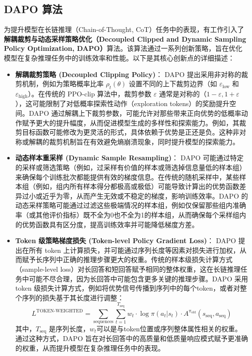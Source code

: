 \documentclass{article}
\begin{document}
\subsection{DAPO 算法}
为提升模型在长链推理（Chain-of-Thought, CoT）任务中的表现，有工作引入了\textbf{解耦裁剪与动态采样策略优化（Decoupled Clipped and Dynamic Sampling Policy Optimization, DAPO）}算法\cite{yu2025dapo}。该算法通过一系列创新策略，旨在优化模型在复杂推理任务中的训练效率和性能。以下是其核心创新点的详细描述：

\begin{itemize}
    \item \textbf{解耦裁剪策略 (Decoupled Clipping Policy)}：
    DAPO 提出采用非对称的裁剪机制，例如为策略概率比率 $\rho_t(\theta)$ 设置不同的上下裁剪边界（如 $\varepsilon_{\text{low}}$ 和 $\varepsilon_{\text{high}}$）。在传统的 PPO-clip 算法中，裁剪参数 $\varepsilon$ 通常是对称的（$1-\varepsilon, 1+\varepsilon$），这可能限制了对低概率探索性动作（exploration tokens）的奖励提升空间。DAPO 通过解耦上下裁剪参数，可能允许对那些带来正向优势的低概率动作赋予更大的提升幅度，从而促进模型生成的多样性和探索能力。例如，其裁剪目标函数可能修改为更灵活的形式，具体依赖于优势是正还是负。这种非对称或解耦的裁剪机制旨在有效避免熵崩溃现象，同时提升模型的探索能力。

    \item \textbf{动态样本重采样 (Dynamic Sample Resampling)}：
    DAPO 可能通过特定的采样或筛选策略（例如，过采样有价值的样本或筛选掉信息量低的样本组）来确保每个训练批次都能提供有效的梯度信息。在传统的随机采样中，某些样本组（例如，组内所有样本得分都极高或极低）可能导致计算出的优势函数差异过小或近乎为零，从而产生无效或不稳定的梯度，影响训练效率。DAPO 的动态采样策略可能通过过滤这些极端情况的样本组，例如仅保留那些组内准确率（或其他评价指标）既不全为0也不全为1的样本组，从而确保每个采样组内的优势函数具有区分度，提高训练效率并可能降低梯度方差。

    \item \textbf{Token 级策略梯度损失 (Token-level Policy Gradient Loss)}：
    DAPO 提出在所有 token 上计算损失，并可能通过序列长度等因素对损失进行加权，从而赋予长序列中正确的推理步骤更大的权重。传统的样本级损失计算方式（sample-level loss）对长回答和短回答赋予相同的整体权重，这在长链推理任务中可能不尽合理，因为长回答中可能包含更多关键的推理步骤。DAPO 采用 token 级损失计算方式，例如将优势信号传播到序列中的每个token，或者对整个序列的损失基于其长度进行调整：
    \[
    L^{\text{TOKEN-WEIGHTED}} = \sum_{\text{sequences}} \sum_{t=1}^{T_{\text{seq}}} w_t \cdot \log \pi(a_t|s_t) \cdot A^{\pi_{\text{old}}}(s_{\text{seq}}, a_{\text{seq}})
    \]
    其中，$T_{\text{seq}}$ 是序列长度，$w_t$可以是与token位置或序列整体属性相关的权重。通过这种方式，DAPO 旨在对长回答中的高质量和低质量响应模式赋予更准确的权重，从而提升模型在复杂推理任务中的表现。


\end{itemize}
\end{document}
